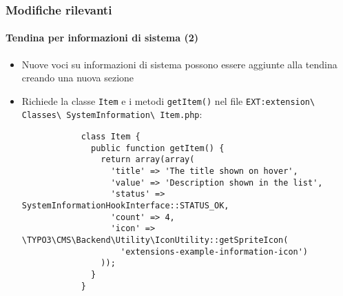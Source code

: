 \begin{frame}[fragile]
	\frametitle{Modifiche rilevanti}
	\framesubtitle{Tendina per informazioni di sistema (2)}

	\lstset{basicstyle=\tiny\ttfamily}

	\begin{itemize}

		\item Nuove voci su informazioni di sistema possono essere aggiunte alla tendina creando una nuova sezione

		\item Richiede la classe \texttt{Item} e i metodi \texttt{getItem()} nel file
			\small
				\texttt{EXT:extension\textbackslash
					Classes\textbackslash
					SystemInformation\textbackslash
					Item.php}:
			\normalsize

		\begin{lstlisting}
			class Item {
			  public function getItem() {
			    return array(array(
			      'title' => 'The title shown on hover',
			      'value' => 'Description shown in the list',
			      'status' => SystemInformationHookInterface::STATUS_OK,
			      'count' => 4,
			      'icon' => \TYPO3\CMS\Backend\Utility\IconUtility::getSpriteIcon(
				    'extensions-example-information-icon')
			    ));
			  }
			}
		\end{lstlisting}

	\end{itemize}

\end{frame}

